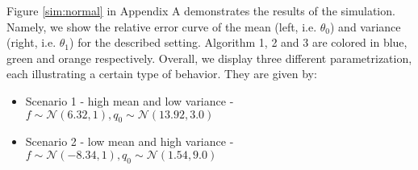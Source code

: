 Figure \ref{sim:normal} in Appendix A demonstrates the results of the simulation. Namely, we show the relative error curve of the mean (left, i.e. $\theta_0$) and variance (right, i.e. $\theta_1$) for the described setting. 
Algorithm 1, 2 and 3 are colored in blue, green and orange respectively. 
Overall, we display three different parametrization, each illustrating a certain type of behavior. 
They are given by:
\begin{itemize}
    \item Scenario 1 - high mean and low variance - $f \sim \mathcal{N}(6.32, 1), q_0 \sim \mathcal{N}(13.92, 3.0)$
    \item Scenario 2 - low mean and high variance - $f \sim \mathcal{N}(-8.34, 1), q_0 \sim \mathcal{N}(1.54, 9.0)$

\end{itemize}
